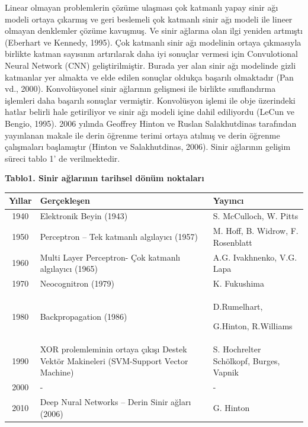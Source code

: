 \documentclass{article}
\begin{document}
\newpage

    Linear olmayan problemlerin çözüme ulaşması
çok katmanlı yapay sinir ağı modeli ortaya
çıkarmış ve geri beslemeli çok katmanlı sinir ağı
modeli ile lineer olmayan denklemler çözüme
kavuşmuş. Ve sinir ağlarına olan ilgi yeniden
artmıştı (Eberhart ve Kennedy, 1995).
Çok katmanlı sinir ağı modelinin ortaya
çıkmasıyla birlikte katman sayısının artırılarak
daha iyi sonuçlar vermesi için Convulotional
Neural Network (CNN) geliştirilmiştir. Burada
yer alan sinir ağı modelinde gizli katmanlar yer
almakta ve elde edilen sonuçlar oldukça başarılı
olmaktadır (Pan vd., 2000). Konvolüsyonel sinir ağlarının gelişmesi ile birlikte sınıflandırma işlemleri daha başarılı
sonuçlar vermiştir. Konvolüsyon işlemi ile obje
üzerindeki hatlar belirli hale getiriliyor ve sinir
ağı modeli içine dahil ediliyordu (LeCun ve Bengio, 1995). 2006 yılında Geoffrey Hinton ve Ruslan Salakhutdinas tarafından yayınlanan makale ile derin öğrenme terimi ortaya atılmış ve
derin öğrenme çalışmaları başlamıştır (Hinton ve Salakhutdinas, 2006). Sinir ağlarının gelişim süreci tablo 1’ de verilmektedir.


\vspace{15pt}

{\centering \textbf{Tablo1. Sinir ağlarının tarihsel dönüm noktaları}}
\vspace{10pt}

\begin{tabular}{c|p{5cm}|p{5cm}}
  
  \textbf{Yıllar} & \textbf{Gerçekleşen} & \textbf{Yayıncı}\\
  \hline
  1940 & Elektronik Beyin (1943) & S. McCulloch, W. Pitts \\
  \hline
  1950 & Perceptron – Tek katmanlı algılayıcı (1957) & M. Hoff, B. Widrow,  F. Rosenblatt \\
  \hline
  1960 & Multi Layer Perceptron- Çok katmanlı algılayıcı (1965) & A.G. Ivakhnenko, V.G. Lapa \\
  \hline
  1970 & Neocognitron (1979) & K. Fukushima \\
  \hline
  1980 & Backpropagation (1986) & D.Rumelhart,
  
  G.Hinton, R.Williams \\
  \hline
  1990 & XOR prolemleminin ortaya çıkışı  Destek Vektör Makineleri (SVM-Support Vector Machine) & S. Hochrelter
Schölkopf, Burges, Vapnik \\
  \hline
 2000 & - & - \\
  \hline
  2010 & Deep Nural Networks – Derin Sinir ağları (2006) & G. Hinton \\
  \hline
\end{tabular}
\vspace{10pt}
\end{document}
